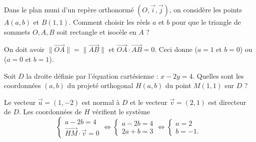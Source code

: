 \begin{question}
Dans le plan muni d'un repère orthonormé $(O,\vec{i},\vec{j})$, on considère les points $\displaystyle A(a,b)$ et $\displaystyle B(1,1)$. Comment choisir les réels $a$ et $b$ pour que le triangle de sommets $O,A,B$ soit rectangle et isocèle en $A$ ?
\begin{answers}  
\end{answers}
\begin{explanations}
On doit avoir $\displaystyle \|\overrightarrow{OA}\|=\|\overrightarrow{AB}\|$ et $\overrightarrow{OA}\cdot\overrightarrow{AB}=0$. Ceci donne ($a=1$ et $b=0$) ou ($a=0$ et $b=1$).
\end{explanations}
\end{question}



\begin{question}
Soit $D$ la droite définie par l'équation cartésienne : $x-2y=4$. Quelles sont les coordonnées $(a,b)$ du projeté orthogonal $H(a,b)$ du point $M(1,1)$ sur $D$ ?
\begin{answers}  
\end{answers}
\begin{explanations}
Le vecteur $\vec{u}=(1,-2)$ est normal à $D$ et le vecteur $\vec{v}=(2,1)$ est directeur de $D$. Les coordonnées de $H$ vérifient le système
$$\left\{\begin{array}{l}a-2b=4\\ \overrightarrow{HM}\cdot\vec{v}=0
\end{array}\right. \Leftrightarrow \left\{\begin{array}{l}a-2b=4\\ 2a+b=3
\end{array}\right. \Leftrightarrow \left\{\begin{array}{l}a=2\\ b=-1.
\end{array}\right.$$
\end{explanations}
\end{question}



